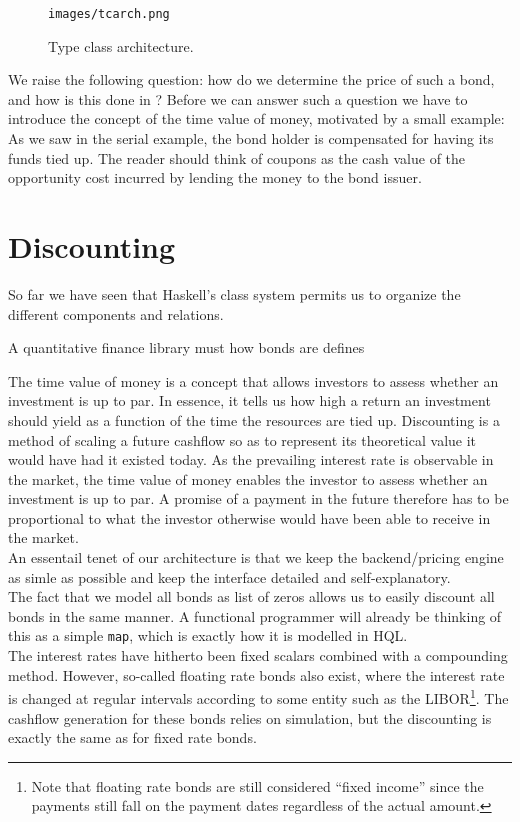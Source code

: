 \begin{figure}[!htb]
\centering
\texttt{images/tcarch.png}
\caption{Type class architecture.}
\label{fig:comp02}
\end{figure}

We raise the following question: how do we determine the price of such a bond, 
and how is this done in \hql? Before we can answer such a question we have to 
introduce the concept of the time value of money, motivated by a small example: 
As we saw in the serial example, the bond holder is compensated for having its 
funds tied up. The reader should think of coupons as the cash value of the 
opportunity cost incurred by lending the money to the bond issuer.

\section{Discounting}

So far we have seen that Haskell's class system permits us to organize the 
different components and relations.

A quantitative finance library must how bonds are \hql defines

The time value of money is a concept that allows investors to assess whether an 
investment is up to par. In essence, it tells us how high a return an 
investment should yield as a function of the time the resources are tied up. 
Discounting is a method of scaling a future cashflow so as to represent its 
theoretical value it would have had it existed today. As the prevailing 
interest rate is observable in the market, the time value of money enables the 
investor to assess whether an investment is up to par. A promise of a payment 
in the future therefore has to be proportional to what the investor otherwise 
would have been able to receive in the market.\\

An essentail tenet of our architecture is that we keep the backend/pricing 
engine as simle as possible and keep the interface detailed and 
self-explanatory.\\

The fact that we model all bonds as list of zeros allows us to easily discount 
all bonds in the same manner. A functional programmer will already be thinking 
of this as a simple \texttt{map}, which is exactly how it is modelled in HQL.\\

The interest rates have hitherto been fixed scalars combined with a compounding 
method. However, so-called floating rate bonds also exist, where the interest 
rate is changed at regular intervals according to some entity such as the 
LIBOR\footnote{Note that floating rate bonds are still considered “fixed 
income” since the payments still fall on the payment dates regardless of the 
actual amount.}. The cashflow generation for these bonds relies on simulation, 
but the discounting is exactly the same as for fixed rate bonds.\\

